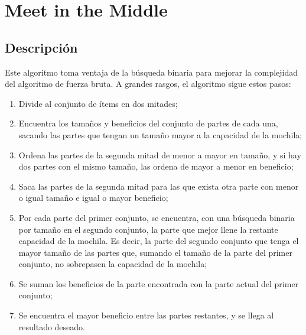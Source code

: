 \documentclass[10pt, a4paper]{article}
\begin{document}
\section{Meet in the Middle}
\subsection{Descripción}
Este algoritmo toma ventaja de la búsqueda binaria para mejorar la complejidad del algoritmo de fuerza bruta. A grandes rasgos, el algoritmo sigue estos pasos: \\
\begin{enumerate}
	\item Divide al conjunto de ítems en dos mitades;
	\item Encuentra los tamaños y beneficios del conjunto de partes de cada una, sacando las partes que tengan un tamaño mayor a la capacidad de la mochila;
	\item Ordena las partes de la segunda mitad de menor a mayor en tamaño, y si hay dos partes con el mismo tamaño, las ordena de mayor a menor en beneficio;
	\item Saca las partes de la segunda mitad para las que exista otra parte con menor o igual tamaño e igual o mayor beneficio;
	\item Por cada parte del primer conjunto, se encuentra, con una búsqueda binaria por tamaño en el segundo conjunto, la parte que mejor llene la restante capacidad de la mochila. Es decir, la parte del segundo conjunto que tenga el mayor tamaño de las partes que, sumando el tamaño de la parte del primer conjunto, no sobrepasen la capacidad de la mochila;
	\item Se suman los beneficios de la parte encontrada con la parte actual del primer conjunto;
	\item Se encuentra el mayor beneficio entre las partes restantes, y se llega al resultado deseado.
\end{enumerate}
\end{document}
